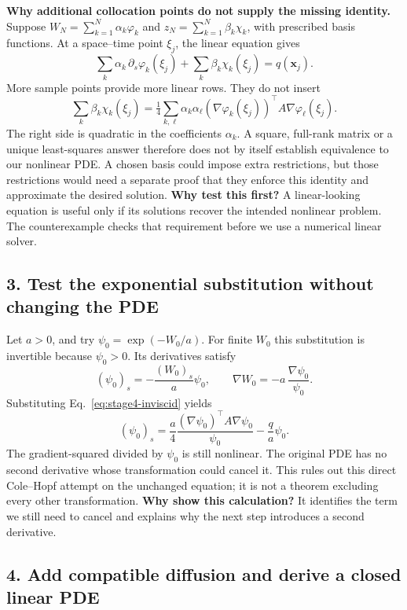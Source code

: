 \documentclass[11pt,a4paper]{article}
\begin{document}
\textbf{Why additional collocation points do not supply the missing
identity.} Suppose
$W_N=\sum_{k=1}^N\alpha_k\varphi_k$ and
$z_N=\sum_{k=1}^N\beta_k\chi_k$, with prescribed basis functions.
At a space--time point $\xi_j$, the linear equation gives
\[
 \sum_k\alpha_k\,\partial_s\varphi_k(\xi_j)
 +\sum_k\beta_k\chi_k(\xi_j)=q(\mathbf x_j).
\]
More sample points provide more linear rows. They do not insert
\[
 \sum_k\beta_k\chi_k(\xi_j)=
 \tfrac14\sum_{k,\ell}\alpha_k\alpha_\ell
 (\nabla\varphi_k(\xi_j))^\top A\nabla\varphi_\ell(\xi_j).
\]
The right side is quadratic in the coefficients $\alpha_k$. A square,
full-rank matrix or a unique least-squares answer therefore does not by
itself establish equivalence to our nonlinear PDE. A chosen basis could
impose extra restrictions, but those restrictions would need a separate
proof that they enforce this identity and approximate the desired solution.
\textbf{Why test this first?} A linear-looking equation is useful only if
its solutions recover the intended nonlinear problem. The counterexample
checks that requirement before we use a numerical linear solver.

\subsection*{3. Test the exponential substitution without changing the PDE}

Let $a>0$, and try $\psi_0=\exp(-W_0/a)$. For finite $W_0$ this
substitution is invertible because $\psi_0>0$. Its derivatives satisfy
\[
 (\psi_0)_s=-\frac{(W_0)_s}{a}\psi_0,
 \qquad\nabla W_0=-a\,\frac{\nabla\psi_0}{\psi_0}.
\]
Substituting Eq.~\eqref{eq:stage4-inviscid} yields
\begin{equation}
 (\psi_0)_s=
 \frac{a}{4}\frac{(\nabla\psi_0)^\top A\nabla\psi_0}{\psi_0}
 -\frac{q}{a}\psi_0.
 \label{eq:stage4-exponential-fails}
\end{equation}
The gradient-squared divided by $\psi_0$ is still nonlinear. The original
PDE has no second derivative whose transformation could cancel it.
This rules out this direct Cole--Hopf attempt on the unchanged equation;
it is not a theorem excluding every other transformation.
\textbf{Why show this calculation?} It identifies the term we still need
to cancel and explains why the next step introduces a second derivative.

\subsection*{4. Add compatible diffusion and derive a closed linear PDE}
\end{document}
